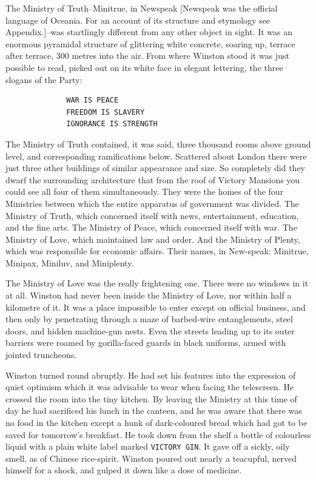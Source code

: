 The Ministry of Truth--Minitrue, in Newspeak \([\)Newspeak was the
official language of Oceania. For an account of its structure and
etymology see Appendix.\(]\)--was startlingly different from any other
object in sight. It was an enormous pyramidal structure of glittering
white concrete, soaring up, terrace after terrace, 300 metres into the
air. From where Winston stood it was just possible to read, picked out
on its white face in elegant lettering, the three slogans of the Party:

\begin{verbatim}
              WAR IS PEACE
              FREEDOM IS SLAVERY
              IGNORANCE IS STRENGTH
\end{verbatim}

The Ministry of Truth contained, it was said, three thousand rooms above
ground level, and corresponding ramifications below. Scattered about
London there were just three other buildings of similar appearance and
size. So completely did they dwarf the surrounding architecture that
from the roof of Victory Mansions you could see all four of them
simultaneously. They were the homes of the four Ministries between which
the entire apparatus of government was divided. The Ministry of Truth,
which concerned itself with news, entertainment, education, and the fine
arts. The Ministry of Peace, which concerned itself with war. The
Ministry of Love, which maintained law and order. And the Ministry of
Plenty, which was responsible for economic affairs. Their names, in
New-speak: Minitrue, Minipax, Miniluv, and Miniplenty.

The Ministry of Love was the really frightening one. There were no
windows in it at all. Winston had never been inside the Ministry of
Love, nor within half a kilometre of it. It was a place impossible to
enter except on official business, and then only by penetrating through
a maze of barbed-wire entanglements, steel doors, and hidden machine-gun
nests. Even the streets leading up to its outer barriers were roamed by
gorilla-faced guards in black uniforms, armed with jointed truncheons.

Winston turned round abruptly. He had set his features into the
expression of quiet optimism which it was advisable to wear when facing
the telescreen. He crossed the room into the tiny kitchen. By leaving
the Ministry at this time of day he had sacrificed his lunch in the
canteen, and he was aware that there was no food in the kitchen except a
hunk of dark-coloured bread which had got to be saved for tomorrow's
breakfast. He took down from the shelf a bottle of colourless liquid
with a plain white label marked \texttt{VICTORY\ GIN}. It gave off a
sickly, oily smell, as of Chinese rice-spirit. Winston poured out nearly
a teacupful, nerved himself for a shock, and gulped it down like a dose
of medicine.


